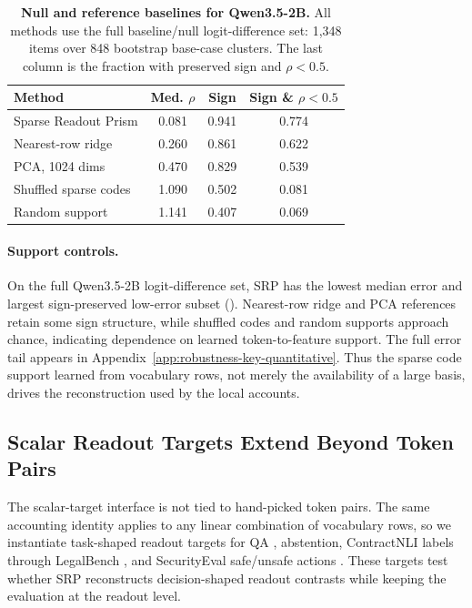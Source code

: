 \begin{table}[t]
\caption{\textbf{Null and reference baselines for Qwen3.5-2B.}
All methods use the full baseline/null logit-difference set: 1,348 items over
848 bootstrap base-case clusters. The last column is the fraction with preserved
sign and \(\rho<0.5\).}
\label{tab:main-baseline-null-comparison}
\centering
\scriptsize
\setlength{\tabcolsep}{3.2pt}
\renewcommand{\arraystretch}{1.06}
\begin{tabular}{@{}lccc@{}}
\toprule
Method & Med. \(\rho\) & Sign & \makecell{Sign \&\\ \(\rho<0.5\)} \\
\midrule
Sparse Readout Prism & 0.081 & 0.941 & 0.774 \\
Nearest-row ridge & 0.260 & 0.861 & 0.622 \\
PCA, 1024 dims & 0.470 & 0.829 & 0.539 \\
Shuffled sparse codes & 1.090 & 0.502 & 0.081 \\
Random support & 1.141 & 0.407 & 0.069 \\
\bottomrule
\end{tabular}
\end{table}

\paragraph{Support controls.}
On the full Qwen3.5-2B logit-difference set, SRP has the lowest median error and
largest sign-preserved low-error subset
().
Nearest-row ridge \citep{hoerl1970ridge} and PCA \citep{jolliffe2002principal}
references retain some sign structure, while shuffled codes and random supports
approach chance, indicating dependence on learned token-to-feature support. The
full error tail appears in
Appendix~\ref{app:robustness-key-quantitative}.
Thus the sparse code support learned from vocabulary rows, not merely the
availability of a large basis, drives the reconstruction used by the local
accounts.

\subsection{Scalar Readout Targets Extend Beyond Token Pairs}

The scalar-target interface is not tied to hand-picked token pairs. The same
accounting identity applies to any linear combination of vocabulary rows, so we
instantiate task-shaped readout targets for QA
\citep{rajpurkar2018squad2,yang2018hotpotqa}, abstention, ContractNLI labels
through LegalBench \citep{koreeda2021contractnli,guha2023legalbench}, and
SecurityEval safe/unsafe actions \citep{siddiq2022securityeval}. These targets
test whether SRP reconstructs decision-shaped readout contrasts while keeping
the evaluation at the readout level.

